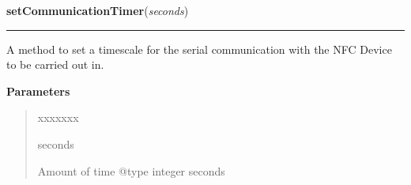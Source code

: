 \hspace{.8\funcindent}\begin{boxedminipage}{\funcwidth}

    \raggedright \textbf{setCommunicationTimer}(\textit{seconds})

    \vspace{-1.5ex}

    \rule{\textwidth}{0.5\fboxrule}
\setlength{\parskip}{2ex}
    A method to set a timescale for the serial communication with the NFC 
    Device to be carried out in.

\setlength{\parskip}{1ex}
      \textbf{Parameters}
      \vspace{-1ex}

      \begin{quote}
        \begin{Ventry}{xxxxxxx}

          \item[seconds]

          Amount of time @type integer seconds

        \end{Ventry}

      \end{quote}

    \end{boxedminipage}

    \label{NFC_Device:NFC_Device:startCommunication}

    \vspace{0.5ex}

